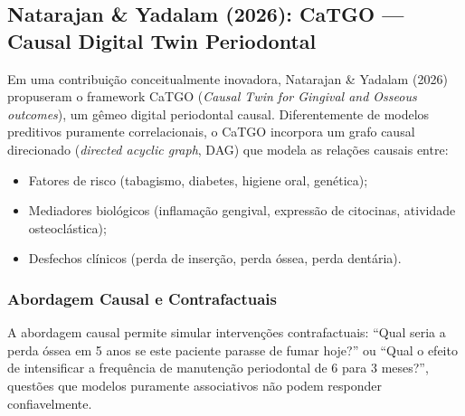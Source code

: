 \subsection{Natarajan \& Yadalam (2026): CaTGO --- Causal Digital Twin Periodontal}

Em uma contribuição conceitualmente inovadora, Natarajan \& Yadalam (2026) propuseram o framework CaTGO (\textit{Causal Twin for Gingival and Osseous outcomes}), um gêmeo digital periodontal causal. Diferentemente de modelos preditivos puramente correlacionais, o CaTGO incorpora um grafo causal direcionado (\textit{directed acyclic graph}, DAG) que modela as relações causais entre:
\begin{itemize}
    \item Fatores de risco (tabagismo, diabetes, higiene oral, genética);
    \item Mediadores biológicos (inflamação gengival, expressão de citocinas, atividade osteoclástica);
    \item Desfechos clínicos (perda de inserção, perda óssea, perda dentária).
\end{itemize}

\subsubsection{Abordagem Causal e Contrafactuais}

A abordagem causal permite simular intervenções contrafactuais: ``Qual seria a perda óssea em 5 anos se este paciente parasse de fumar hoje?'' ou ``Qual o efeito de intensificar a frequência de manutenção periodontal de 6 para 3 meses?'', questões que modelos puramente associativos não podem responder confiavelmente.

